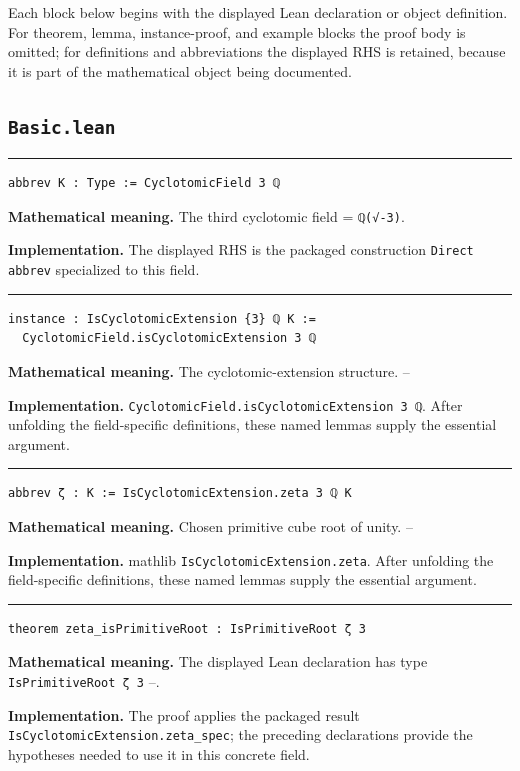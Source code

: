 \documentclass[UTF8,a4paper,11pt,fontset=fandol]{ctexart}
\theoremstyle{definition}
\newcommand{\statementsep}{\par\medskip\hrule\medskip}
\begin{document}
Each block below begins with the displayed Lean declaration or object definition. For theorem, lemma, instance-proof, and example blocks the proof body is omitted; for definitions and abbreviations the displayed RHS is retained, because it is part of the mathematical object being documented.

\subsection{\texttt{Basic.lean}}

\statementsep
\begin{verbatim}
abbrev K : Type := CyclotomicField 3 ℚ
\end{verbatim}
\noindent\textbf{Mathematical meaning.} The third cyclotomic field = \texttt{ℚ(√-3)}.\par
\noindent\textbf{Implementation.} The displayed RHS is the packaged construction \texttt{Direct abbrev} specialized to this field.\par
\statementsep
\begin{verbatim}
instance : IsCyclotomicExtension {3} ℚ K :=
  CyclotomicField.isCyclotomicExtension 3 ℚ
\end{verbatim}
\noindent\textbf{Mathematical meaning.} The cyclotomic-extension structure. --\par
\noindent\textbf{Implementation.} \texttt{CyclotomicField.\allowbreak{}isCyclotomicExtension 3 ℚ}. After unfolding the field-specific definitions, these named lemmas supply the essential argument.\par
\statementsep
\begin{verbatim}
abbrev ζ : K := IsCyclotomicExtension.zeta 3 ℚ K
\end{verbatim}
\noindent\textbf{Mathematical meaning.} Chosen primitive cube root of unity. --\par
\noindent\textbf{Implementation.} mathlib \texttt{IsCyclotomicExtension.\allowbreak{}zeta}. After unfolding the field-specific definitions, these named lemmas supply the essential argument.\par
\statementsep
\begin{verbatim}
theorem zeta_isPrimitiveRoot : IsPrimitiveRoot ζ 3
\end{verbatim}
\noindent\textbf{Mathematical meaning.} The displayed Lean declaration has type \texttt{IsPrimitiveRoot ζ 3} --.\par
\noindent\textbf{Implementation.} The proof applies the packaged result \texttt{IsCyclotomicExtension.\allowbreak{}zeta\_\allowbreak{}spec}; the preceding declarations provide the hypotheses needed to use it in this concrete field.\par
\end{document}
